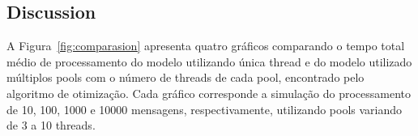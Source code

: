 \subsection{Discussion}
\label{subsec:discussion}
A Figura~\ref{fig:comparasion} apresenta quatro gráficos comparando o tempo total médio de processamento do modelo utilizando única thread e do modelo utilizado múltiplos pools com o número de threads de cada pool, encontrado pelo algoritmo de otimização. Cada gráfico corresponde a simulação do processamento de 10, 100, 1000 e 10000 mensagens, respectivamente, utilizando pools variando de 3 a 10 threads. 

